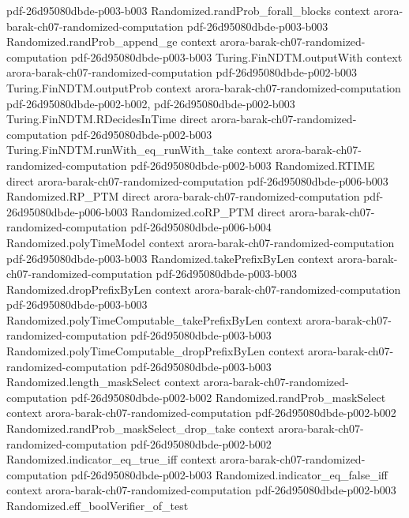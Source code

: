 \begin{theorem}
  {pdf-26d95080dbde-p003-b003}
\proofstep
  {Randomized.randProb_forall_blocks}
  {context}
  {arora-barak-ch07-randomized-computation}
  {pdf-26d95080dbde-p003-b003}
\proofstep
  {Randomized.randProb_append_ge}
  {context}
  {arora-barak-ch07-randomized-computation}
  {pdf-26d95080dbde-p003-b003}
\proofstep
  {Turing.FinNDTM.outputWith}
  {context}
  {arora-barak-ch07-randomized-computation}
  {pdf-26d95080dbde-p002-b003}
\proofstep
  {Turing.FinNDTM.outputProb}
  {context}
  {arora-barak-ch07-randomized-computation}
  {pdf-26d95080dbde-p002-b002,
    pdf-26d95080dbde-p002-b003}
\proofstep
  {Turing.FinNDTM.RDecidesInTime}
  {direct}
  {arora-barak-ch07-randomized-computation}
  {pdf-26d95080dbde-p002-b003}
\proofstep
  {Turing.FinNDTM.runWith_eq_runWith_take}
  {context}
  {arora-barak-ch07-randomized-computation}
  {pdf-26d95080dbde-p002-b003}
\proofstep
  {Randomized.RTIME}
  {direct}
  {arora-barak-ch07-randomized-computation}
  {pdf-26d95080dbde-p006-b003}
\proofstep
  {Randomized.RP_PTM}
  {direct}
  {arora-barak-ch07-randomized-computation}
  {pdf-26d95080dbde-p006-b003}
\proofstep
  {Randomized.coRP_PTM}
  {direct}
  {arora-barak-ch07-randomized-computation}
  {pdf-26d95080dbde-p006-b004}
\proofstep
  {Randomized.polyTimeModel}
  {context}
  {arora-barak-ch07-randomized-computation}
  {pdf-26d95080dbde-p003-b003}
\proofstep
  {Randomized.takePrefixByLen}
  {context}
  {arora-barak-ch07-randomized-computation}
  {pdf-26d95080dbde-p003-b003}
\proofstep
  {Randomized.dropPrefixByLen}
  {context}
  {arora-barak-ch07-randomized-computation}
  {pdf-26d95080dbde-p003-b003}
\proofstep
  {Randomized.polyTimeComputable_takePrefixByLen}
  {context}
  {arora-barak-ch07-randomized-computation}
  {pdf-26d95080dbde-p003-b003}
\proofstep
  {Randomized.polyTimeComputable_dropPrefixByLen}
  {context}
  {arora-barak-ch07-randomized-computation}
  {pdf-26d95080dbde-p003-b003}
\proofstep
  {Randomized.length_maskSelect}
  {context}
  {arora-barak-ch07-randomized-computation}
  {pdf-26d95080dbde-p002-b002}
\proofstep
  {Randomized.randProb_maskSelect}
  {context}
  {arora-barak-ch07-randomized-computation}
  {pdf-26d95080dbde-p002-b002}
\proofstep
  {Randomized.randProb_maskSelect_drop_take}
  {context}
  {arora-barak-ch07-randomized-computation}
  {pdf-26d95080dbde-p002-b002}
\proofstep
  {Randomized.indicator_eq_true_iff}
  {context}
  {arora-barak-ch07-randomized-computation}
  {pdf-26d95080dbde-p002-b003}
\proofstep
  {Randomized.indicator_eq_false_iff}
  {context}
  {arora-barak-ch07-randomized-computation}
  {pdf-26d95080dbde-p002-b003}
\proofstep
  {Randomized.eff_boolVerifier_of_test}

\end{theorem}
